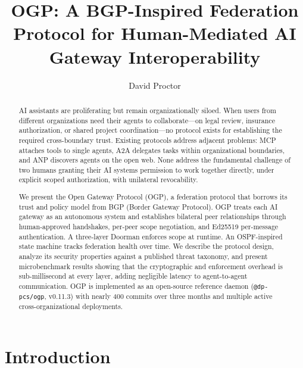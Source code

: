 \documentclass[sigconf,nonacm]{acmart}
\begin{document}
\title{OGP: A BGP-Inspired Federation Protocol for Human-Mediated AI Gateway Interoperability}

\author{David Proctor}

\begin{abstract}
AI assistants are proliferating but remain organizationally siloed.
When users from different organizations need their agents to collaborate---on
legal review, insurance authorization, or shared project coordination---no
protocol exists for establishing the required cross-boundary trust.
Existing protocols address adjacent problems: MCP attaches tools to single
agents, A2A delegates tasks within organizational boundaries, and ANP
discovers agents on the open web.
None address the fundamental challenge of two humans granting their AI
systems permission to work together directly, under explicit scoped
authorization, with unilateral revocability.

We present the Open Gateway Protocol (OGP), a federation protocol that
borrows its trust and policy model from BGP (Border Gateway Protocol).
OGP treats each AI gateway as an autonomous system and establishes
bilateral peer relationships through human-approved handshakes, per-peer
scope negotiation, and Ed25519 per-message authentication.
A three-layer Doorman enforces scope at runtime.
An OSPF-inspired state machine tracks federation health over time.
We describe the protocol design, analyze its security properties against
a published threat taxonomy, and present microbenchmark results showing
that the cryptographic and enforcement overhead is sub-millisecond at
every layer, adding negligible latency to agent-to-agent communication.
OGP is implemented as an open-source reference daemon (\texttt{@dp-pcs/ogp},
v0.11.3) with nearly 400 commits over three months and multiple active
cross-organizational deployments.
\end{abstract}

\maketitle

\section{Introduction}
\end{document}
